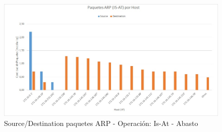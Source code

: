 \begin{figure}[h!]
\centering
\includegraphics[scale=0.7]{./img/arp_isAt_abasto.jpg}
\caption{Source/Destination paquetes ARP - Operación: Is-At - Abasto}
\end{figure}
